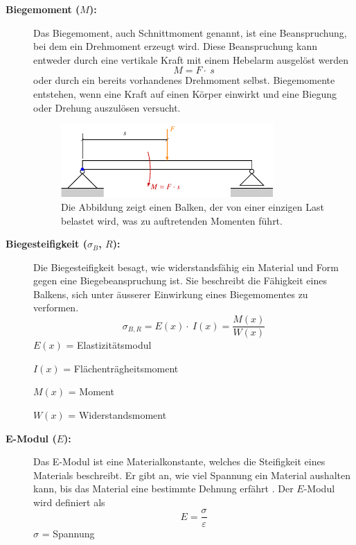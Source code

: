 \begin{description}
\item[\textbf{Biegemoment ($M$):}] Das Biegemoment, auch Schnittmoment genannt, ist eine Beanspruchung, bei dem ein Drehmoment erzeugt wird.
Diese Beanspruchung kann entweder durch eine vertikale Kraft mit einem Hebelarm ausgelöst werden
\begin{equation}
	M=
	F\cdot\ s
\end{equation}
oder durch ein bereits vorhandenes Drehmoment selbst.
Biegemomente entstehen, wenn eine Kraft auf einen Körper einwirkt und eine Biegung oder Drehung auszulösen versucht.
\begin{figure}
	\centering
	\includegraphics[width=0.8\textwidth]{papers/balken/images/teil1/Biegemoment.pdf}
	\caption{Die Abbildung zeigt einen Balken, der von einer einzigen Last belastet wird, was zu auftretenden Momenten führt.}
	\label{fig:Die Abbildung zeigt einen Balken, der von einer einzigen Last belastet wird, was zu auftretenden Momenten führt.}
\end{figure}

\item[\textbf{Biegesteifigkeit ($σ_B$, $R$):}] Die Biegesteifigkeit besagt, wie widerstandsfähig ein Material und Form gegen eine Biegebeanspruchung ist.
Sie beschreibt die Fähigkeit eines Balkens, sich unter äusserer Einwirkung eines Biegemomentes zu verformen.
\begin{equation}
\sigma_{B,R}=E
\left(x\right)\cdot\ I\left(x\right)=
\frac{M(x)}{W(x)}
\end{equation}
$E(x)$ = Elastizitätsmodul

$I(x)$ = Flächenträgheitsmoment

$M(x)$ = Moment 

$W(x)$ = Widerstandsmoment

\item[\textbf{E-Modul ($E$):}] Das E-Modul ist eine Materialkonstante, welches die Steifigkeit eines Materials beschreibt.
Er gibt an, wie viel Spannung ein Material aushalten kann, bis das Material eine bestimmte Dehnung erfährt \cite{balken:Elastizitaetsmodul}.
Der $E$-Modul wird definiert als
\begin{equation}
E=
\frac{\sigma}{\varepsilon}
\end{equation}
$\sigma$ = Spannung


\end{description}
